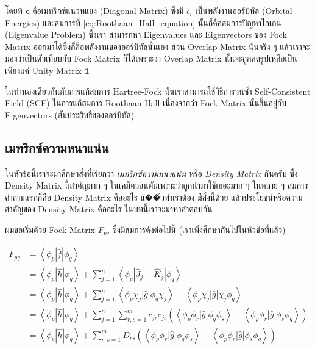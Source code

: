\noindent โดยที่ $\boldsymbol{\epsilon}$ คือเมทริกซ์แนวทแยง (Diagonal Matrix) ซึ่งมี $\epsilon_i$ เป็นพลังงานออร์บิทัล
(Orbital Energies) และสมการที่ \eqref{eq:Roothaan_Hall_equation} นั้นก็คือสมการปัญหาไอเกน (Eigenvalue Problem) ซึ่งเรา%
สามารถหา Eigenvalues และ Eigenvectors ของ Fock Matrix ออกมาได้ซึ่งก็คือพลังงานของออร์บิทัลนั่นเอง ส่วน Overlap Matrix
นั้นจริง ๆ แล้วเราจะมองว่าเป็นตัวเทียบกับ Fock Matrix ก็ได้เพราะว่า Overlap Matrix นั้นจะถูกลดรูปเหลือเป็นเพียงแค่ Unity Matrix
$\bm{1}$

ในทำนองเดียวกันกับการแก้สมการ Hartree-Fock นั้นเราสามารถใช้วิธีการวนซ้ำ Self-Consistent Field (SCF) ในการแก้สมการ
Roothaan-Hall เนื่องจากว่า Fock Matrix นั้นขึ้นอยู่กับ Eigenvectors (สัมประสิทธิ์ของออร์บิทัล)

\subsection{เมทริกซ์ความหนาแน่น}

ในหัวข้อนี้เราจะมาศึกษาสิ่งที่เรียกว่า \textit{เมทริกซ์ความหนาแน่น} หรือ \textit{Density Matrix} กันครับ ซึ่ง Density Matrix
นี้สำคัญมาก ๆ ในเคมีควอนตัมเพราะว่าถูกนำมาใช้เยอะมาก ๆ ในหลาย ๆ สมการ คำถามแรกก็คือ Density Matrix คืออะไร แ��้วทำเราต้อง%
มีสิ่งนี้ด้วย แล้วประโยชน์หรือความสำคัญของ Density Matrix คืออะไร ในบทนี้เราจะมาหาคำตอบกัน

ผมขอเริ่มด้วย Fock Matrix $F_{p q}$  ซึ่งมีสมการดังต่อไปนี้ (เราเพิ่งศึกษากันไปในหัวข้อที่แล้ว)

\begin{equation}
  \label{eq:Fock_Matrix_Elements}
  \begin{aligned}
    F_{p q}
     & =\left\langle\phi_p|\hat{f}| \phi_q\right\rangle             \\
     & = \left\langle\phi_p|\hat{h}| \phi_q\right\rangle
    + \sum_{j=1}^n
    \left\langle\phi_p\left|\hat{J}_j
    - \hat{K}_j\right| \phi_q\right\rangle                          \\
     & =\left\langle\phi_p|\hat{h}| \phi_q\right\rangle
    + \sum_{j=1}^n
    \left\langle\phi_p \chi_j|\hat{g}| \phi_q \chi_j\right\rangle
    - \left\langle\phi_p \chi_j|\hat{g}| \chi_j \phi_q\right\rangle \\
     & =\left\langle\phi_p|\hat{h}| \phi_q\right\rangle
    + \sum_{j=1}^n \sum_{r, s=1}^m
    c_{j r} c_{j s}
    \left(
    \left\langle\phi_p \phi_r|\hat{g}| \phi_q \phi_s\right\rangle
    - \left\langle\phi_p \phi_r|\hat{g}| \phi_s \phi_q\right\rangle
    \right)                                                         \\
     & =\left\langle\phi_p|\hat{h}| \phi_q\right\rangle
    + \sum_{r, s=1}^m D_{r s}
    \left(
    \left\langle\phi_p \phi_r|\hat{g}| \phi_q \phi_s\right\rangle
    - \left\langle\phi_p \phi_r|\hat{g}| \phi_s \phi_q\right\rangle
    \right)
  \end{aligned}
\end{equation}

